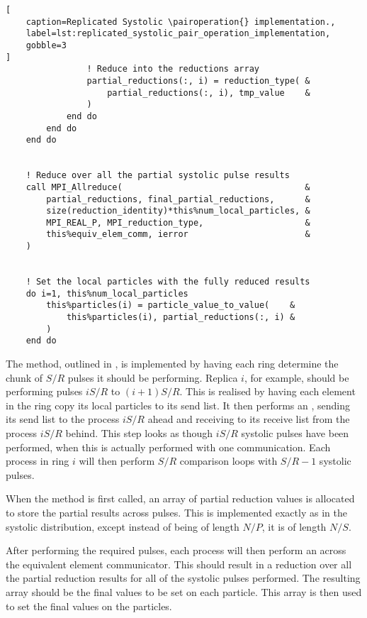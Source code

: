 \begin{lstlisting}[
    caption=Replicated Systolic \pairoperation{} implementation.,
    label=lst:replicated_systolic_pair_operation_implementation,
    gobble=3
]
                ! Reduce into the reductions array
                partial_reductions(:, i) = reduction_type( &
                    partial_reductions(:, i), tmp_value    &
                )
            end do
        end do
    end do


    ! Reduce over all the partial systolic pulse results
    call MPI_Allreduce(                                    &
        partial_reductions, final_partial_reductions,      &
        size(reduction_identity)*this%num_local_particles, &
        MPI_REAL_P, MPI_reduction_type,                    &
        this%equiv_elem_comm, ierror                       &
    )


    ! Set the local particles with the fully reduced results
    do i=1, this%num_local_particles
        this%particles(i) = particle_value_to_value(    &
            this%particles(i), partial_reductions(:, i) &
        )
    end do
\end{lstlisting}

The \pairoperation{} method, outlined in
,
is implemented by having each ring
determine the chunk of $S/R$ pulses it should be performing.
%
Replica $i$, for example, should be performing pulses
$iS/R$ to $(i+1)S/R$.
%
This is realised by having each element in the ring copy its local
particles to its send list.
%
It then performs an \mpisendrecv{}, sending its send list to
the process $iS/R$ ahead and receiving to its receive list from
the process $iS/R$ behind.
%
This step looks as though $iS/R$ systolic pulses have been performed,
when this is actually performed with one communication.
%
Each process in ring $i$ will then perform $S/R$ comparison loops
with $S/R-1$ systolic pulses.

When the method is first called, an array of partial reduction
values is allocated to store the partial results across pulses.
%
This is implemented exactly as in the systolic distribution,
except instead of being of length $N/P$, it is of length $N/S$.

After performing the required pulses, each process will then perform
an \mpiallreduce{} across the equivalent element communicator.
%
This should result in a reduction over all the partial reduction
results for all of the systolic pulses performed.
%
The resulting array should be the final values to be set on each particle.
%
This array is then used to set the final values on the particles.
